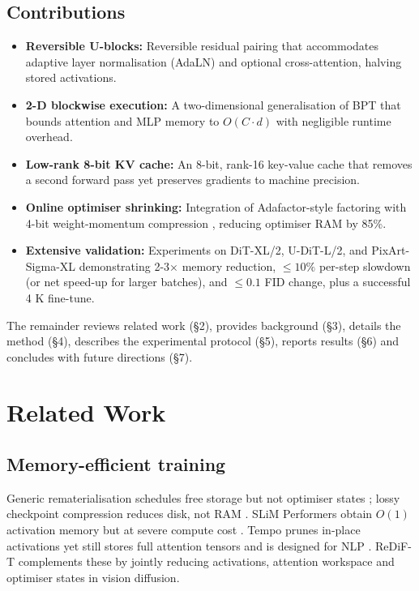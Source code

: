 \documentclass{article}
\begin{document}
\subsection{Contributions}
\begin{itemize}
\item \textbf{Reversible U-blocks:} Reversible residual pairing that accommodates adaptive layer normalisation (AdaLN) and optional cross-attention, halving stored activations.
\item \textbf{2-D blockwise execution:} A two-dimensional generalisation of BPT that bounds attention and MLP memory to \(O(C\cdot d)\) with negligible runtime overhead.
\item \textbf{Low-rank 8-bit KV cache:} An 8-bit, rank-16 key-value cache that removes a second forward pass yet preserves gradients to machine precision.
\item \textbf{Online optimiser shrinking:} Integration of Adafactor-style factoring with 4-bit weight-momentum compression \cite{li-2024-excp}, reducing optimiser RAM by 85\%.
\item \textbf{Extensive validation:} Experiments on DiT-XL/2, U-DiT-L/2, and PixArt-Sigma-XL demonstrating 2-3\(\times\) memory reduction, \(\le 10\%\) per-step slowdown (or net speed-up for larger batches), and \(\le 0.1\) FID change, plus a successful 4 K fine-tune.
\end{itemize}
The remainder reviews related work (\S2), provides background (\S3), details the method (\S4), describes the experimental protocol (\S5), reports results (\S6) and concludes with future directions (\S7).

\section{Related Work}
\subsection{Memory-efficient training}
Generic rematerialisation schedules free storage but not optimiser states \cite{kirisame-2020-dynamic}; lossy checkpoint compression reduces disk, not RAM \cite{chen-2020-efficient}. SLiM Performers obtain \(O(1)\) activation memory but at severe compute cost \cite{likhosherstov-2020-sub}. Tempo prunes in-place activations yet still stores full attention tensors and is designed for NLP \cite{andoorveedu-2022-tempo}. ReDiF-T complements these by jointly reducing activations, attention workspace and optimiser states in vision diffusion.
\end{document}
